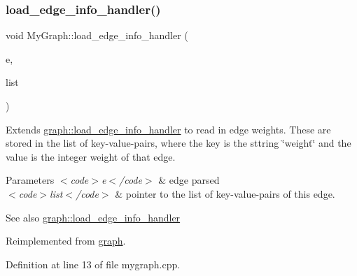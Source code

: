 \mbox{\label{class_my_graph_aae6f9d1beab66851272f9064e2058064}} 
\subsubsection{\texorpdfstring{load\+\_\+edge\+\_\+info\+\_\+handler()}{load\_edge\_info\_handler()}}
{\footnotesize\ttfamily void My\+Graph\+::load\+\_\+edge\+\_\+info\+\_\+handler (\begin{DoxyParamCaption}\item[{\mbox{\hyperlink{classedge}{edge}}}]{e,  }\item[{\mbox{\hyperlink{struct_g_m_l__pair}{G\+M\+L\+\_\+pair}} $\ast$}]{list }\end{DoxyParamCaption})\hspace{0.3cm}{\ttfamily [virtual]}}

Extends \mbox{\hyperlink{classgraph_ad049a2f8c191a7dc359e684ef56304d1}{graph\+::load\+\_\+edge\+\_\+info\+\_\+handler}} to read in edge weights. These are stored in the list of key-\/value-\/pairs, where the key is the sttring \char`\"{}weight\char`\"{} and the value is the integer weight of that edge.


\begin{DoxyParams}{Parameters}
{\em $<$code$>$e$<$/code$>$} & edge parsed \\
\hline
{\em $<$code$>$list$<$/code$>$} & pointer to the list of key-\/value-\/pairs of this edge. \\
\hline
\end{DoxyParams}
\begin{DoxySeeAlso}{See also}
\mbox{\hyperlink{classgraph_ad049a2f8c191a7dc359e684ef56304d1}{graph\+::load\+\_\+edge\+\_\+info\+\_\+handler}} 
\end{DoxySeeAlso}


Reimplemented from \mbox{\hyperlink{classgraph_ad049a2f8c191a7dc359e684ef56304d1}{graph}}.



Definition at line 13 of file mygraph.\+cpp.


